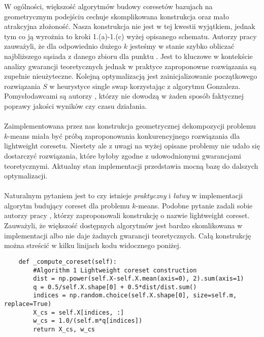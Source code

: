 \noindent
W ogólności, większość algorytmów budowy coresetów bazujach na geometrycznym podejściu cechuje skomplikowana konstrukcja oraz mało atrakcyjna złożoność.
Nasza konstrukcja nie jest w tej kwestii wyjątkiem, jednak tym co ją wyrożnia to kroki 1.(a)-1.(c) wyżej opisanego schematu.
Autorzy pracy \cite{10.1145/1007352.1007400} zauważyli, że dla odpowiednio dużego $k$ jesteśmy w stanie szybko obliczać najbliższego sąsiada z danego zbioru dla punktu \cite{Arya2004LocalSH}.
Jest to kluczowe w kontekście analizy gwarancji teoretycznych jednak w praktyce zaproponowne rozwiązania są zupełnie nieużyteczne.
Kolejną optymalizacją jest zainicjalizowanie początkowego rozwiązania $S$ w heurystyce single swap korzystając z algorytmu Gonzaleza.
Pomysłodawcami są autorzy \cite{10.1145/1007352.1007400}, którzy nie dowodzą w żaden sposób faktycznej poprawy jakości wyników czy czasu działania.
\\~\\
Zaimplementowana przez nas konstrukcja geometrycznej dekompozycji problemu $k$-means miała być próbą zaproponowania konkurencyjnego rozwiązania dla lightweight coresetu.
Niestety ale z uwagi na wyżej opisane problemy nie udało się dostarczyć rozwiązania, które byłoby zgodne z udowodnionymi gwarancjami teoretycznymi.
Aktualny stan implementacji przedstawia mocną bazę do dalszych optymalizacji.   
\\~\\
Naturalnym pytaniem jest to czy istnieje \textit{praktyczny} i \textit{łatwy} w implementacji algorytm budujący coreset dla problemu $k$-means.
Podobne pytanie zadali sobie autorzy pracy \cite{bachem2017scalable}, którzy zaproponowali konstrukcję o nazwie lightweight coreset.
Zauważyli, że większość dostępnych algorytmów jest bardzo skomlikowana w implementacji albo nie daje żadnych gwarancji teoretycznych.
Całą konstrukcję można streścić w kilku linijach kodu widocznego poniżej.
\\
\lstset{language=Python}
\begin{lstlisting}
    def _compute_coreset(self):
        #Algorithm 1 Lightweight coreset construction
        dist = np.power(self.X-self.X.mean(axis=0), 2).sum(axis=1)
        q = 0.5/self.X.shape[0] + 0.5*dist/dist.sum()
        indices = np.random.choice(self.X.shape[0], size=self.m, replace=True)
        X_cs = self.X[indices, :]
        w_cs = 1.0/(self.m*q[indices])
        return X_cs, w_cs
\end{lstlisting}